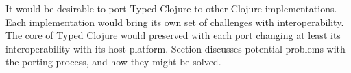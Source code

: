 It would be desirable to port Typed Clojure to other Clojure implementations.
Each implementation would bring its own set of challenges with interoperability.
The core of Typed Clojure would preserved with each port changing at least 
its interoperability with its host platform. Section \label{sec:portability}
discusses potential problems with the porting process, and how
they might be solved.



